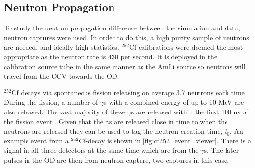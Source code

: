 \subsection{Neutron Propagation}
\par
To study the neutron propagation difference between the simulation and data, neutron captures were used.
In order to do this, a high purity sample of neutrons are needed, and ideally high statistics.
${}^{252}$Cf calibrations were deemed the most appropriate as the neutron rate is 430 per second.
It is deployed in the calibration source tube in the same manner as the AmLi source so neutrons will travel from the OCV towards the OD.
\par
${}^{252}$Cf decays via spontaneous fission releasing on average 3.7 neutrons each time \cite{californium252_ref}.
During the fission, a number of $\gamma$s with a combined energy of up to 10 MeV are also released.
The vast majority of these $\gamma$s are released within the first 100 ns of the fission event \cite{cf252_fission_ref,californium_spectra_ref}.
Given that the $\gamma$s are released close in time to when the neutrons are released they can be used to tag the neutron creation time, $t_0$.
An example event from a ${}^{252}$Cf-decay is shown in \autoref{fig:cf252_event_viewer}.
There is a signal in all three detectors at the same time which are from the $\gamma$s.
The later pulses in the OD are then from neutron capture, two captures in this case.


